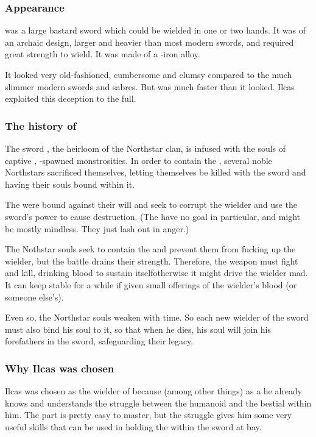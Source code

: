 \subsubsection{Appearance}
\Telderain{} was a large bastard sword which could be wielded in one or two hands. 
It was of an archaic design, larger and heavier than most modern swords, and required great strength to wield. 
It was made of a \dragonsteel-iron alloy. 

It looked very old-fashioned, cumbersome and clumsy compared to the much slimmer modern swords and sabres. 
But was much faster than it looked. 
Ilcas exploited this deception to the full. 





\subsubsection{The history of \Telderain}
The sword \Telderain, the heirloom of the Northstar clan, is infused with the souls of captive \mdaemons, \xzaishann-spawned monstrosities. In order to contain the \mdaemons, several noble Northstars sacrificed themselves, letting themselves be killed with the sword and having their souls bound within it.

The \daemons{} were bound against their will and seek to corrupt the wielder and use the sword's power to cause destruction. (The \daemons{} have no goal in particular, and might be mostly mindless. They just lash out in anger.) 

The Nothstar souls seek to contain the \daemons{} and prevent them from fucking up the wielder, but the battle drains their strength. Therefore, the weapon must fight and kill, drinking blood to sustain itself\dash otherwise it might drive the wielder mad. It can keep stable for a while if given small offerings of the wielder's blood (or someone else's). 

Even so, the Northstar souls weaken with time. So each new wielder of the sword must also bind his soul to it, so that when he dies, his soul will join his forefathers in the sword, safeguarding their legacy. 





\subsubsection{Why Ilcas was chosen}
Ilcas was chosen as the wielder of \Telderain{} because (among other things) as a \nycaneer{} he already knows and understands the struggle between the humanoid and the bestial within him. The \nycan{} part is pretty easy to master, but the struggle gives him some very useful skills that can be used in holding the \daemons{} within the sword at bay. 






